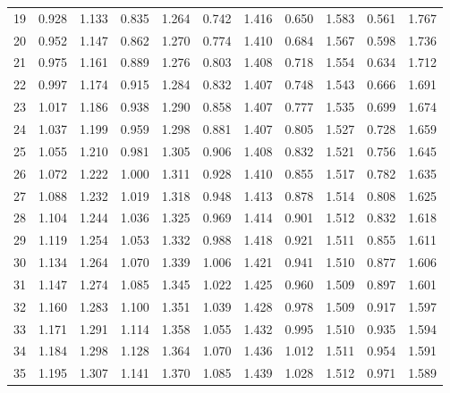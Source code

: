\documentclass[12pt]{article}
\begin{document}
\begin{table}
\begin{center}
{\begin{tabular}{|c|c|c|c|c|c|c|c|c|c|c|}
 19&0.928&1.133&0.835&1.264&
0.742&1.416&0.650&1.583&0.561&1.767\\


20&0.952&1.147&0.862&1.270&0.774&1.410&
0.684&1.567&0.598&1.736\\


21&0.975&1.161&0.889&1.276&0.803&1.408&0.718&1.554&
0.634&1.712\\


22&0.997&1.174 & 0.915&1.284&0.832&1.407&
0.748&1.543&0.666&1.691\\


23&1.017&1.186&0.938&1.290& 0.858&1.407&0.777&1.535&0.699&1.674\\


24 &1.037& 1.199& 0.959 &1.298 &0.881& 1.407 &0.805& 1.527 &0.728&
1.659\\


25& 1.055& 1.210 &0.981 &1.305& 0.906& 1.408 &0.832 &1.521 &0.756&
1.645\\


26 &1.072& 1.222 &1.000& 1.311 &0.928& 1.410 &0.855 &1.517& 0.782&
1.635\\


27 &1.088& 1.232 &1.019& 1.318 &0.948& 1.413& 0.878& 1.514 &0.808&
1.625\\



28& 1.104& 1.244& 1.036 &1.325 &0.969& 1.414& 0.901 &1.512& 0.832&
1.618\\



29 &1.119& 1.254 &1.053& 1.332& 0.988& 1.418& 0.921 &1.511 &0.855&
1.611\\


30&1.134&1.264&1.070&1.339&1.006&1.421&0.941&1.510&0.877&1.606\\

31&1.147&1.274&
1.085&1.345&1.022&1.425&0.960&1.509&0.897&1.601\\


32&1.160&1.283&1.100&1.351&
1.039&1.428&0.978&1.509&0.917&1.597\\


33&1.171&1.291&1.114&1.358&1.055&1.432&0.995&1.510&0.935&1.594\\


34&1.184&1.298&
1.128&1.364&1.070&1.436&1.012&1.511&0.954&1.591\\


35&1.195&1.307&1.141&1.370&
1.085&1.439&1.028&1.512&0.971&1.589\\


\end{tabular}}
\end{center}
\end{table}
\end{document}
